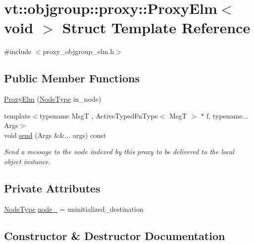\hypertarget{structvt_1_1objgroup_1_1proxy_1_1_proxy_elm_3_01void_01_4}{}\section{vt\+:\+:objgroup\+:\+:proxy\+:\+:Proxy\+Elm$<$ void $>$ Struct Template Reference}
\label{structvt_1_1objgroup_1_1proxy_1_1_proxy_elm_3_01void_01_4}


{\ttfamily \#include $<$proxy\+\_\+objgroup\+\_\+elm.\+h$>$}

\subsection*{Public Member Functions}
\begin{DoxyCompactItemize}
\item 
\hyperlink{structvt_1_1objgroup_1_1proxy_1_1_proxy_elm_3_01void_01_4_ac0574a043c575dafda3686ff9099a4f1}{Proxy\+Elm} (\hyperlink{namespacevt_a866da9d0efc19c0a1ce79e9e492f47e2}{Node\+Type} in\+\_\+node)
\item 
{\footnotesize template$<$typename MsgT , Active\+Typed\+Fn\+Type$<$ Msg\+T $>$ $\ast$ f, typename... Args$>$ }\\void \hyperlink{structvt_1_1objgroup_1_1proxy_1_1_proxy_elm_3_01void_01_4_a823b06cf35e500b7a14f2eadb38c9e6d}{send} (Args \&\&... args) const
\begin{DoxyCompactList}\small\item\em Send a message to the node indexed by this proxy to be delivered to the local object instance. \end{DoxyCompactList}\end{DoxyCompactItemize}
\subsection*{Private Attributes}
\begin{DoxyCompactItemize}
\item 
\hyperlink{namespacevt_a866da9d0efc19c0a1ce79e9e492f47e2}{Node\+Type} \hyperlink{structvt_1_1objgroup_1_1proxy_1_1_proxy_elm_3_01void_01_4_aa09e3bed73c03d683858969775d5d043}{node\+\_\+} = uninitialized\+\_\+destination
\end{DoxyCompactItemize}


\subsection{Constructor \& Destructor Documentation}
\mbox{\label{structvt_1_1objgroup_1_1proxy_1_1_proxy_elm_3_01void_01_4_ac0574a043c575dafda3686ff9099a4f1}} 
